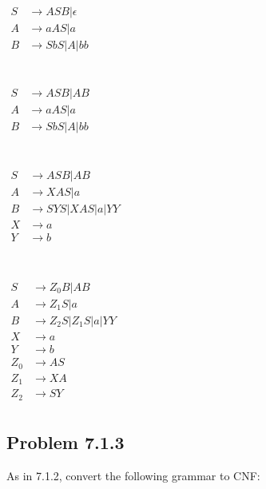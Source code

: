 \documentclass[12pt]{scrbook}
\begin{document}
$ \begin{aligned}
  S &\rightarrow ASB | \epsilon \\
  A &\rightarrow aAS | a \\
  B &\rightarrow SbS | A | bb
  \end{aligned} 
$
\\\\\\
$ \begin{aligned}
  S &\rightarrow ASB | AB \\
  A &\rightarrow aAS | a \\
  B &\rightarrow SbS | A | bb
  \end{aligned} 
$
\\\\\\
$ \begin{aligned}
  S &\rightarrow ASB | AB \\
  A &\rightarrow XAS | a \\
  B &\rightarrow SYS | XAS | a | YY \\
  X &\rightarrow a \\
  Y &\rightarrow b \\
  \end{aligned} 
$
\\\\\\
$ \begin{aligned}
  S &\rightarrow Z_0B | AB \\
  A &\rightarrow Z_1S | a \\
  B &\rightarrow Z_2S | Z_1S | a | YY \\
  X &\rightarrow a \\
  Y &\rightarrow b \\
  Z_0 &\rightarrow AS \\
  Z_1 &\rightarrow XA \\
  Z_2 &\rightarrow SY \\
  \end{aligned} 
$

\subsection*{Problem 7.1.3}As in 7.1.2, convert the following grammar to CNF:
\end{document}
